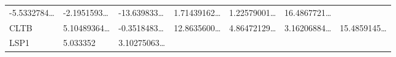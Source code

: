 \documentclass[
]{article}
\begin{document}
\begin{longtable}[]{@{}lllllll@{}}
\begin{minipage}[t]{0.12\columnwidth}
-5.5332784\ldots{}\strut
\end{minipage} & \begin{minipage}[t]{0.12\columnwidth}\raggedright
-2.1951593\ldots{}\strut
\end{minipage} & \begin{minipage}[t]{0.12\columnwidth}\raggedright
-13.639833\ldots{}\strut
\end{minipage} & \begin{minipage}[t]{0.12\columnwidth}\raggedright
1.71439162\ldots{}\strut
\end{minipage} & \begin{minipage}[t]{0.12\columnwidth}\raggedright
1.22579001\ldots{}\strut
\end{minipage} & \begin{minipage}[t]{0.12\columnwidth}\raggedright
16.4867721\ldots{}\strut
\end{minipage}\tabularnewline
\begin{minipage}[t]{0.08\columnwidth}\raggedright
CLTB\strut
\end{minipage} & \begin{minipage}[t]{0.12\columnwidth}\raggedright
5.10489364\ldots{}\strut
\end{minipage} & \begin{minipage}[t]{0.12\columnwidth}\raggedright
-0.3518483\ldots{}\strut
\end{minipage} & \begin{minipage}[t]{0.12\columnwidth}\raggedright
12.8635600\ldots{}\strut
\end{minipage} & \begin{minipage}[t]{0.12\columnwidth}\raggedright
4.86472129\ldots{}\strut
\end{minipage} & \begin{minipage}[t]{0.12\columnwidth}\raggedright
3.16206884\ldots{}\strut
\end{minipage} & \begin{minipage}[t]{0.12\columnwidth}\raggedright
15.4859145\ldots{}\strut
\end{minipage}\tabularnewline
\begin{minipage}[t]{0.08\columnwidth}\raggedright
LSP1\strut
\end{minipage} & \begin{minipage}[t]{0.12\columnwidth}\raggedright
5.033352\strut
\end{minipage} & \begin{minipage}[t]{0.12\columnwidth}\raggedright
3.10275063\ldots{}\strut
\end{minipage} & \begin{minipage}[t]{0.12\columnwidth}\raggedright

\end{minipage}
\end{longtable}
\end{document}
